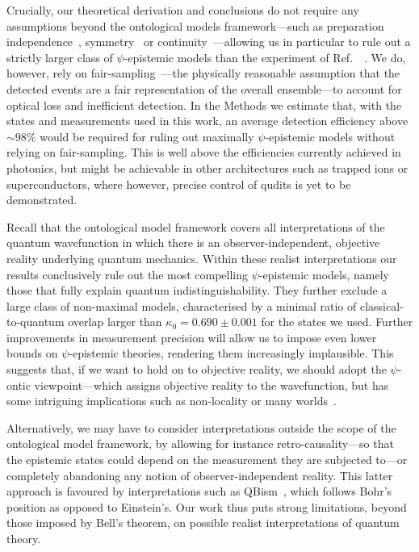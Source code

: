 \documentclass[aps,prl,floatfix,onecolumn,tightenlines,amsmath,amssymb,nofootinbib,12pt]{revtex4-2}
\begin{document}
Crucially, our theoretical derivation and conclusions do not require any assumptions beyond the ontological models framework---such as preparation independence~\cite{Pusey2012,Nigg2012}, symmetry~\cite{Aaronson2013} or continuity~\cite{hardy2013are,Patra2013no-,Patra2013}---allowing us in particular to rule out a strictly larger class of $\psi$-epistemic models than the experiment of Ref.~~\cite{Nigg2012}.
We do, however, rely on fair-sampling~\cite{larsson2014loopholes,RevModPhys.86.419}---the physically reasonable assumption that the detected events are a fair representation of the overall ensemble---to account for optical loss and inefficient detection.
In the Methods we estimate that, with the states and measurements used in this work, an average detection efficiency above $\sim 98 \%$ would be required for ruling out maximally $\psi$-epistemic models without relying on fair-sampling. This is well above the efficiencies currently achieved in photonics, but might be achievable in other architectures such as trapped ions or superconductors, where however, precise control of qudits is yet to be demonstrated.

Recall that the ontological model framework covers all interpretations of the quantum wavefunction in which there is an observer-independent, objective reality underlying quantum mechanics. Within these realist interpretations our results conclusively rule out the most compelling $\psi$-epistemic models, namely those that fully explain quantum indistinguishability. 
They further exclude a large class of non-maximal models, characterised by a minimal ratio of classical-to-quantum overlap larger than $\kappa_0{=}0.690\pm 0.001$ 
for the states we used. Further improvements in measurement precision will allow us to impose even lower bounds on $\psi$-epistemic theories, rendering them increasingly implausible. This suggests that, if we want to hold on to objective reality, we should adopt the $\psi$-ontic viewpoint---which assigns objective reality to the wavefunction, but has some intriguing implications such as non-locality or many worlds~\cite{everett1957relative}.

Alternatively, we may have to consider interpretations outside the scope of the ontological model framework, by allowing for instance retro-causality---so that the epistemic states could depend on the measurement they are subjected to---or completely abandoning any notion of observer-independent reality. This latter approach is favoured by interpretations such as QBism~\cite{caves2002quantum,Fuchs2010,mermin2000QBism}, which follows Bohr's position as opposed to Einstein's.
Our work thus puts strong limitations, beyond those imposed by Bell's theorem, on possible realist interpretations of quantum theory.
\end{document}
